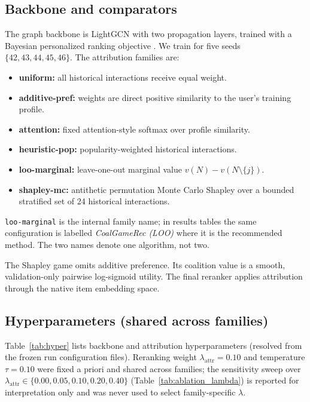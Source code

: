 \documentclass[pdflatex,sn-mathphys-num]{sn-jnl}
\begin{document}
\subsection{Backbone and comparators}\label{subsec:families}

The graph backbone is LightGCN with two propagation layers, trained with a Bayesian personalized ranking objective \cite{rendle2009bpr,he2020lightgcn}. We train for five seeds $\{42,43,44,45,46\}$. The attribution families are:
\begin{itemize}
    \item \textbf{uniform:} all historical interactions receive equal weight.
    \item \textbf{additive-pref:} weights are direct positive similarity to the user's training profile.
    \item \textbf{attention:} fixed attention-style softmax over profile similarity.
    \item \textbf{heuristic-pop:} popularity-weighted historical interactions.
    \item \textbf{loo-marginal:} leave-one-out marginal value $v(N)-v(N\setminus\{j\})$.
    \item \textbf{shapley-mc:} antithetic permutation Monte Carlo Shapley over a bounded stratified set of 24 historical interactions.
\end{itemize}
\texttt{loo-marginal} is the internal family name; in results tables the same configuration is labelled \emph{CoalGameRec (LOO)} where it is the recommended method. The two names denote one algorithm, not two.

The Shapley game omits additive preference. Its coalition value is a smooth, validation-only pairwise log-sigmoid utility. The final reranker applies attribution through the native item embedding space.

\subsection{Hyperparameters (shared across families)}\label{subsec:hyper}
Table~\ref{tab:hyper} lists backbone and attribution hyperparameters (resolved from the frozen run configuration files). Reranking weight $\lambda_{\text{attr}}=0.10$ and temperature $\tau=0.10$ were fixed a priori and shared across families; the sensitivity sweep over $\lambda_{\text{attr}}\in\{0.00,0.05,0.10,0.20,0.40\}$ (Table~\ref{tab:ablation_lambda}) is reported for interpretation only and was never used to select family-specific $\lambda$.
\end{document}
